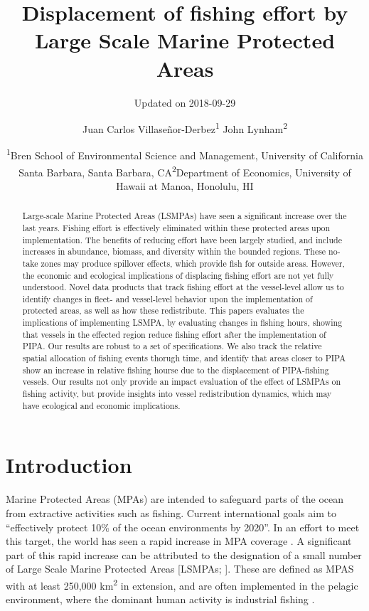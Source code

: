 \documentclass[12pt,]{article}
\title{Displacement of fishing effort by Large Scale Marine Protected Areas}
\subtitle{Updated on 2018-09-29}
\author{Juan Carlos Villaseñor-Derbez\textsuperscript{1} John
Lynham\textsuperscript{2}}
\date{\textsuperscript{1}Bren School of Environmental Science and Management,
University of California Santa Barbara, Santa Barbara,
CA\newline\textsuperscript{2}Department of Economics, University of
Hawaii at Manoa, Honolulu, HI}
\begin{document}
\maketitle
\begin{abstract}
Large-scale Marine Protected Areas (LSMPAs) have seen a significant
increase over the last years. Fishing effort is effectively eliminated
within these protected areas upon implementation. The benefits of
reducing effort have been largely studied, and include increases in
abundance, biomass, and diversity within the bounded regions. These
no-take zones may produce spillover effects, which provide fish for
outside areas. However, the economic and ecological implications of
displacing fishing effort are not yet fully understood. Novel data
products that track fishing effort at the vessel-level allow us to
identify changes in fleet- and vessel-level behavior upon the
implementation of protected areas, as well as how these redistribute.
This papers evaluates the implications of implementing LSMPA, by
evaluating changes in fishing hours, showing that vessels in the
effected region reduce fishing effort after the implementation of PIPA.
Our results are robust to a set of specifications. We also track the
relative spatial allocation of fishing events thorugh time, and identify
that areas closer to PIPA show an increase in relative fishing hourse
due to the displacement of PIPA-fishing vessels. Our results not only
provide an impact evaluation of the effect of LSMPAs on fishing
activity, but provide insights into vessel redistribution dynamics,
which may have ecological and economic implications.
\end{abstract}

\section{Introduction}\label{introduction}

Marine Protected Areas (MPAs) are intended to safeguard parts of the
ocean from extractive activities such as fishing. Current international
goals aim to ``effectively protect 10\% of the ocean environments by
2020''. In an effort to meet this target, the world has seen a rapid
increase in MPA coverage \citep{wood_2008,sala_2018b}. A significant
part of this rapid increase can be attributed to the designation of a
small number of Large Scale Marine Protected Areas {[}LSMPAs;
\citep{gray_2017}{]}. These are defined as MPAS with at least 250,000
km\textsuperscript{2} \citep{toonen_2013} in extension, and are often
implemented in the pelagic environment, where the dominant human
activity is industrial fishing \citep{gray_2017}.
\end{document}
